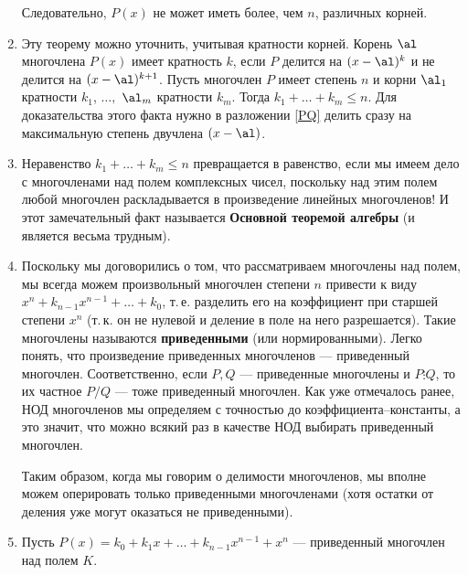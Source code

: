 \begin{enumerate}
Следовательно, $P(x)$ не может иметь более, чем $n$, различных корней.
\epf

\item Эту теорему можно уточнить, учитывая кратности корней. Корень $\al$ многочлена $P(x)$ имеет кратность $k$, если $P$ делится на $(x-\al)^k$ и не делится на $(x-\al)^{k+1}$. Пусть многочлен $P$ имеет степень $n$ и корни $\al_1$ кратности $k_1$, $\dots,$ $\al_m$ кратности $k_m$. Тогда $k_1+\dots+k_m\le n$. Для доказательства этого факта нужно в разложении \eqref{PQ} делить сразу на максимальную степень двучлена $(x-\al)$.
\item Неравенство $k_1+\dots+k_m\le n$ превращается в равенство, если мы имеем дело с многочленами над полем комплексных чисел, поскольку над этим полем любой многочлен раскладывается в произведение линейных многочленов! И этот замечательный факт называется \textbf{Основной теоремой алгебры} (и является весьма трудным).




\item Поскольку мы договорились о том, что рассматриваем многочлены над полем, мы всегда можем произвольный многочлен степени $n$ привести к виду $x^n+k_{n-1}x^{n-1}+\dots+k_0$, т.\,е. разделить его на коэффициент при старшей степени $x^n$ (т.\,к. он не нулевой и деление в поле на него разрешается). Такие многочлены называются \textbf{приведенными} (или нормированными). Легко понять, что произведение приведенных многочленов --- приведенный многочлен. Соответственно, если $P,Q$ --- приведенные многочлены и $P\vdots Q$, то их частное $P/Q$ --- тоже приведенный многочлен. Как уже отмечалось ранее, НОД многочленов мы определяем с точностью до коэффициента--константы, а это значит, что можно всякий раз в качестве НОД выбирать приведенный многочлен.

Таким образом, когда мы говорим о делимости многочленов, мы вполне можем оперировать только приведенными многочленами (хотя остатки от деления уже могут оказаться не приведенными).

\item Пусть $P(x)=k_0+k_1x+\dots+k_{n-1}x^{n-1}+x^n$ --- приведенный многочлен над полем $K$.


\end{enumerate}
